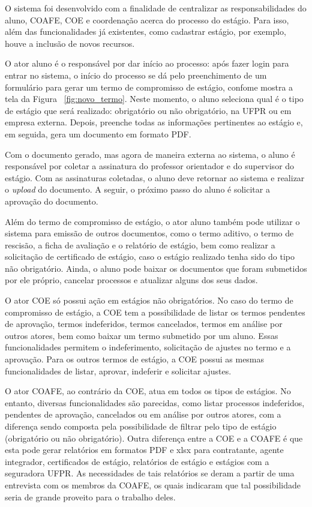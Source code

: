 \documentclass[conference,a4paper,10pt]{IEEETran}
\begin{document}
O sistema foi desenvolvido com a finalidade de centralizar as responsabilidades do aluno, COAFE, COE e coordenação acerca do processo do estágio. Para isso, além das funcionalidades já existentes, como cadastrar estágio, por exemplo, houve a inclusão de novos recursos.

O ator aluno é o responsável por dar início ao processo: após fazer login para entrar no sistema, o início do processo se dá pelo preenchimento de um formulário para gerar um termo de compromisso de estágio, confome mostra a tela da Figura ~\ref{fig:novo_termo}. Neste momento, o aluno seleciona qual é o tipo de estágio que será realizado: obrigatório ou não obrigatório, na UFPR ou em empresa externa. Depois, preenche todas as informações pertinentes ao estágio e, em seguida, gera um documento em formato PDF.

Com o documento gerado, mas agora de maneira externa ao sistema, o aluno é responsável por coletar
a assinatura do professor orientador e do supervisor do estágio. Com as assinaturas coletadas, o aluno deve retornar ao sistema e realizar o \textit{upload} do documento. A seguir, o próximo passo do aluno é solicitar a aprovação do documento.

Além do termo de compromisso de estágio, o ator aluno também pode utilizar o sistema para emissão de outros documentos, como o termo aditivo, o termo de rescisão, a ficha de avaliação e o relatório de estágio, bem como realizar a solicitação de certificado de estágio, caso o estágio realizado tenha sido do tipo não obrigatório. Ainda, o aluno pode baixar os documentos que foram submetidos por ele próprio, cancelar processos e atualizar alguns dos seus dados. 

O ator COE só possui ação em estágios não obrigatórios. No caso do termo de compromisso de estágio, a COE tem a possibilidade de listar os termos pendentes de aprovação, termos indeferidos, termos cancelados, termos em análise por outros atores, bem como baixar um termo submetido por um aluno. Essas funcionalidades
permitem o indeferimento, solicitação de ajustes no termo e a aprovação. Para os outros termos de estágio, a COE possui as mesmas funcionalidades de listar, aprovar, indeferir e solicitar ajustes.

O ator COAFE, ao contrário da COE, atua em todos os tipos de estágios. No entanto, diversas funcionalidades são parecidas, como listar processos indeferidos, pendentes de aprovação, cancelados ou em análise por outros atores, com a diferença sendo composta pela possibilidade de filtrar pelo tipo de estágio (obrigatório
ou não obrigatório). Outra diferença entre a COE e a COAFE é que esta pode gerar relatórios em formatos PDF e xlsx para contratante, agente integrador, certificados de estágio, relatórios de estágio e estágios com a seguradora UFPR. As necessidades de tais relatórios se deram a partir de uma entrevista com os membros da COAFE, os quais indicaram que tal possibilidade seria de grande proveito para o trabalho deles. 
\end{document}
